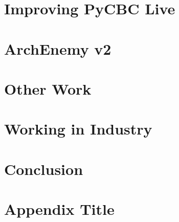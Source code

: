\documentclass[12pt,twoside]{report} %
\begin{document}
\chapter{Improving PyCBC Live}


\chapter{ArchEnemy v2}


\chapter{Other Work}


\chapter{Working in Industry}


\chapter{Conclusion}


\appendix
\chapter{Appendix Title}

\end{document}
